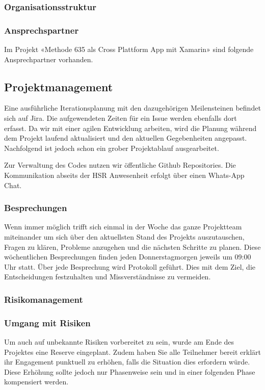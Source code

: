 \subsubsection{Organisationsstruktur}

\subsubsection{Ansprechspartner}
Im Projekt «Methode 635 als Cross Plattform App mit Xamarin» sind folgende Ansprechpartner vorhanden.

\subsection{Projektmanagement}
Eine ausführliche Iterationsplanung mit den dazugehörigen Meilensteinen befindet sich auf Jira. Die aufgewendeten Zeiten für ein Issue werden ebenfalls dort erfasst. 
Da wir mit einer agilen Entwicklung arbeiten, wird die Planung während dem Projekt laufend aktualisiert und den aktuellen Gegebenheiten angepasst. 
Nachfolgend ist jedoch schon ein grober Projektablauf ausgearbeitet. 

Zur Verwaltung des Codes nutzen wir öffentliche Github Repositories. Die Kommunikation abseits der HSR Anwesenheit erfolgt über einen Whats-App Chat.


\subsubsection{Besprechungen}
Wenn immer möglich trifft sich einmal in der Woche das ganze Projektteam miteinander um sich über den aktuellsten Stand des Projekts auszutauschen, Fragen zu klären, Probleme anzugehen und die nächsten Schritte zu planen. 
Diese wöchentlichen Besprechungen finden jeden Donnerstagmorgen jeweils um 09:00 Uhr statt.
Über jede Besprechung wird Protokoll geführt. Dies mit
dem Ziel, die Entscheidungen festzuhalten und Missverständnisse zu vermeiden.

\subsubsection{Risikomanagement}

\subsubsection{Umgang mit Risiken}
Um auch auf unbekannte Risiken vorbereitet zu sein, wurde am Ende des Projektes eine Reserve eingeplant. Zudem haben Sie alle Teilnehmer bereit erklärt ihr Engagement punktuell zu erhöhen, falls die Situation dies erfordern würde. Diese Erhöhung sollte jedoch nur Phasenweise sein und in einer folgenden Phase kompensiert werden.

